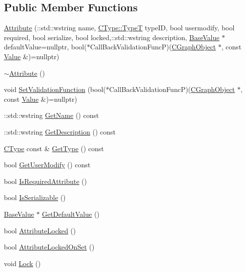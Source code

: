 \subsection*{Public Member Functions}
\begin{DoxyCompactItemize}
\item 
\hyperlink{class_n_m_1_1_o_d_b_1_1_attribute_a3e7774f1121be2a5794640ada4c9129c}{Attribute} (\+::std\+::wstring name, \hyperlink{class_n_m_1_1_o_d_b_1_1_c_type_ad03443dbcd5bbf2ab1dfe9380d11a467}{C\+Type\+::\+Type\+T} type\+I\+D, bool usermodify, bool required, bool serialize, bool locked,\+::std\+::wstring description, \hyperlink{class_n_m_1_1_o_d_b_1_1_base_value}{Base\+Value} $\ast$default\+Value=nullptr, bool($\ast$Call\+Back\+Validation\+Func\+P)(\hyperlink{class_n_m_1_1_o_d_b_1_1_c_graph_object}{C\+Graph\+Object} $\ast$, const \hyperlink{class_n_m_1_1_o_d_b_1_1_value}{Value} \&)=nullptr)
\item 
\hyperlink{class_n_m_1_1_o_d_b_1_1_attribute_ad8d58ac9f280af512afda57f57e08585}{$\sim$\+Attribute} ()
\item 
void \hyperlink{class_n_m_1_1_o_d_b_1_1_attribute_a9eced0bd5f66be64b21ed13f1b6e9359}{Set\+Validation\+Function} (bool($\ast$Call\+Back\+Validation\+Func\+P)(\hyperlink{class_n_m_1_1_o_d_b_1_1_c_graph_object}{C\+Graph\+Object} $\ast$, const \hyperlink{class_n_m_1_1_o_d_b_1_1_value}{Value} \&)=nullptr)
\item 
\+::std\+::wstring \hyperlink{class_n_m_1_1_o_d_b_1_1_attribute_ae2b0acaa68fb2e78685608b3bf9726cf}{Get\+Name} () const 
\item 
\+::std\+::wstring \hyperlink{class_n_m_1_1_o_d_b_1_1_attribute_a5644511eac8d0217f718d7632791c5c2}{Get\+Description} () const 
\item 
\hyperlink{class_n_m_1_1_o_d_b_1_1_c_type}{C\+Type} const \& \hyperlink{class_n_m_1_1_o_d_b_1_1_attribute_a9cfff89f826a541389fc7bed1ff795ba}{Get\+Type} () const 
\item 
bool \hyperlink{class_n_m_1_1_o_d_b_1_1_attribute_a5288bec14a37aec031da85999833ff6b}{Get\+User\+Modify} () const 
\item 
bool \hyperlink{class_n_m_1_1_o_d_b_1_1_attribute_a99b47d2f3199b0cc4c5d27e2721ede87}{Is\+Required\+Attribute} ()
\item 
bool \hyperlink{class_n_m_1_1_o_d_b_1_1_attribute_aedc4c6a6b24835a03b85f318b60eb486}{Is\+Serializable} ()
\item 
\hyperlink{class_n_m_1_1_o_d_b_1_1_base_value}{Base\+Value} $\ast$ \hyperlink{class_n_m_1_1_o_d_b_1_1_attribute_aaeaf08ee581e8c56d683a08f124f2ba4}{Get\+Default\+Value} ()
\item 
bool \hyperlink{class_n_m_1_1_o_d_b_1_1_attribute_af33e5fec0212494165da892d90cb763f}{Attribute\+Locked} ()
\item 
bool \hyperlink{class_n_m_1_1_o_d_b_1_1_attribute_a977f782441c1b65c61c6c22cd492d186}{Attribute\+Locked\+On\+Set} ()
\item 
void \hyperlink{class_n_m_1_1_o_d_b_1_1_attribute_a9fe48d1d746cab921acdce2ce4d9b200}{Lock} ()
\end{DoxyCompactItemize}
